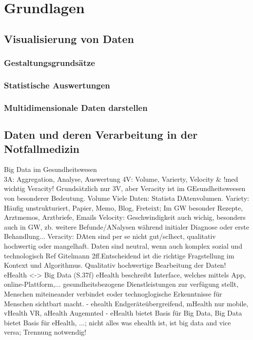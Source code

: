 \chapter{Grundlagen}
\label{chap:Grundlagen}
\minitoc\pagebreak
\lipsum[1-42]

\section{Visualisierung von Daten}
\subsection{Gestaltungsgrundsätze}
\subsection{Statistische Auswertungen}
\subsection{Multidimensionale Daten darstellen}

\section{Daten und deren Verarbeitung in der Notfallmedizin} %
Big Data im Gesundheitswesen\\

3A: Aggregation, Analyse, Auswertung
4V: Volume, Varierty, Velocity \& !med wichtig Veracity! 
Grundsätzlich nur 3V, aber Veracity ist im GEsundheitsweesen von besonderer Bedeutung. 
Volume Viele Daten: Statista DAtenvolumen.
Variety: Häufig unstrukturiert, Papier, Memo, Blog, Freteixt; Im GW besonder Rezepte, Arztmemos, Arztbriefe, Emails
Velocity: Geschwindigkeit auch wichig, besonders auch in GW, zb. weitere Befunde/ANalysen während initialer Diagnose oder erste Behandlung...
Veracity: DAten sind per se nicht gut/sclhect, qualitativ hochwertig oder mangelhaft. Daten sind neutral, wenn auch komplex sozial und technologisch Ref Gitelmann 2ff.Entscheidend ist die richtige Fragstellung im Kontext und Algorithmus. Qualitativ hochwertige Bearbeitung der Daten! \\

eHealth <-> Big Data (S.37f)
eHealth beschreibt Interface, welches mittels App, online-Plattform,... gesundheitsbezogene Dienstleistungen zur verfügung stellt, Menschen miteineander verbindet eoder technoglogische Erkenntnisse für Menschen sichtbart macht. 
- ehealth Endgeräteübergreifend, mHealth nur mobile, vHealth VR, aHealth Augemnted
- eHealth bietet Basis für Big Data, Big Data bietet Basis für eHealth, ...; nicht alles was ehealth ist, ist big data and vice versa; Trennung notwendig!\\

